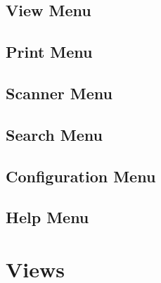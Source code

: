\subsection{View Menu}
\subsection{Print Menu}
\subsection{Scanner Menu}
\subsection{Search Menu}
\subsection{Configuration Menu}
\subsection{Help Menu}

\section{Views}
\label{sec:application_views}
